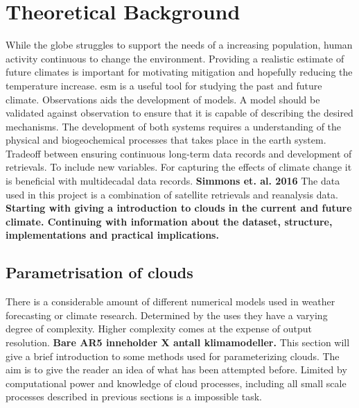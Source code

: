 \setcounter{chapter}{1} 
\chapter{Theoretical Background} \label{ch:theoretical_back}
While the globe struggles to support the needs of a increasing population, human activity continuous to change the environment. Providing a realistic estimate of future climates is important for motivating mitigation and hopefully reducing the temperature increase. \acrfull{esm} is a useful tool for studying the past and future climate. Observations aids the development of models. A model should be validated against observation to ensure that it is capable of describing the desired mechanisms. 
The development of both systems requires a understanding of the physical and biogeochemical processes that takes place in the earth system. Tradeoff between ensuring continuous long-term data records and development of retrievals. To include new variables. For capturing the effects of climate change it is beneficial with multidecadal data records. \textbf{Simmons et. al. 2016} The data used in this project is a combination of satellite retrievals and reanalysis data. \textbf{Starting with giving a introduction to clouds in the current and future climate. Continuing with information about the dataset, structure, implementations and practical implications.}



\section{Parametrisation of clouds} \label{sec:param_clouds}
There is a considerable amount of different numerical models used in weather forecasting or climate research. Determined by the uses they have a varying degree of complexity. Higher complexity comes at the expense of output resolution.
\textbf{Bare AR5 inneholder X antall klimamodeller.} This section will give a brief introduction to some methods used for parameterizing clouds. The aim is to give the reader an idea of what has been attempted before. Limited by computational power and knowledge of cloud processes, including all small scale processes described in previous sections is a impossible task. 

